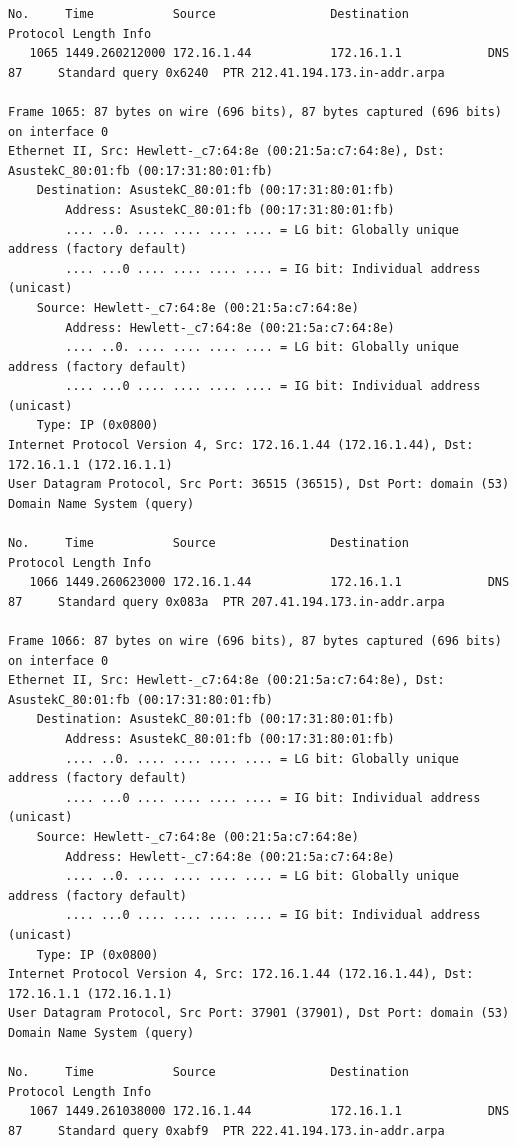 \documentclass[a4paper,11pt]{article}
\begin{document}
\begin{lstlisting}
No.     Time           Source                Destination           Protocol Length Info
   1065 1449.260212000 172.16.1.44           172.16.1.1            DNS      87     Standard query 0x6240  PTR 212.41.194.173.in-addr.arpa

Frame 1065: 87 bytes on wire (696 bits), 87 bytes captured (696 bits) on interface 0
Ethernet II, Src: Hewlett-_c7:64:8e (00:21:5a:c7:64:8e), Dst: AsustekC_80:01:fb (00:17:31:80:01:fb)
    Destination: AsustekC_80:01:fb (00:17:31:80:01:fb)
        Address: AsustekC_80:01:fb (00:17:31:80:01:fb)
        .... ..0. .... .... .... .... = LG bit: Globally unique address (factory default)
        .... ...0 .... .... .... .... = IG bit: Individual address (unicast)
    Source: Hewlett-_c7:64:8e (00:21:5a:c7:64:8e)
        Address: Hewlett-_c7:64:8e (00:21:5a:c7:64:8e)
        .... ..0. .... .... .... .... = LG bit: Globally unique address (factory default)
        .... ...0 .... .... .... .... = IG bit: Individual address (unicast)
    Type: IP (0x0800)
Internet Protocol Version 4, Src: 172.16.1.44 (172.16.1.44), Dst: 172.16.1.1 (172.16.1.1)
User Datagram Protocol, Src Port: 36515 (36515), Dst Port: domain (53)
Domain Name System (query)

No.     Time           Source                Destination           Protocol Length Info
   1066 1449.260623000 172.16.1.44           172.16.1.1            DNS      87     Standard query 0x083a  PTR 207.41.194.173.in-addr.arpa

Frame 1066: 87 bytes on wire (696 bits), 87 bytes captured (696 bits) on interface 0
Ethernet II, Src: Hewlett-_c7:64:8e (00:21:5a:c7:64:8e), Dst: AsustekC_80:01:fb (00:17:31:80:01:fb)
    Destination: AsustekC_80:01:fb (00:17:31:80:01:fb)
        Address: AsustekC_80:01:fb (00:17:31:80:01:fb)
        .... ..0. .... .... .... .... = LG bit: Globally unique address (factory default)
        .... ...0 .... .... .... .... = IG bit: Individual address (unicast)
    Source: Hewlett-_c7:64:8e (00:21:5a:c7:64:8e)
        Address: Hewlett-_c7:64:8e (00:21:5a:c7:64:8e)
        .... ..0. .... .... .... .... = LG bit: Globally unique address (factory default)
        .... ...0 .... .... .... .... = IG bit: Individual address (unicast)
    Type: IP (0x0800)
Internet Protocol Version 4, Src: 172.16.1.44 (172.16.1.44), Dst: 172.16.1.1 (172.16.1.1)
User Datagram Protocol, Src Port: 37901 (37901), Dst Port: domain (53)
Domain Name System (query)

No.     Time           Source                Destination           Protocol Length Info
   1067 1449.261038000 172.16.1.44           172.16.1.1            DNS      87     Standard query 0xabf9  PTR 222.41.194.173.in-addr.arpa


\end{lstlisting}
\end{document}

